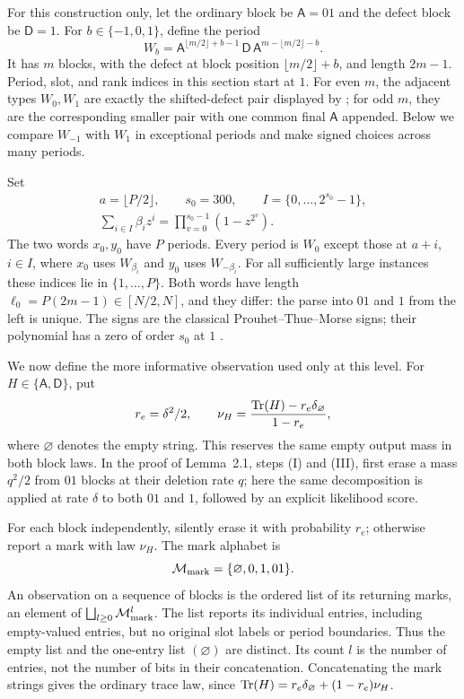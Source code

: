 For this construction only, let the ordinary block be
\(\mathsf A=01\) and the defect block be \(\mathsf D=1\). For
\(b\in\{-1,0,1\}\), define the period
\[
 W_b=\mathsf A^{\lfloor m/2\rfloor+b-1}\,
       \mathsf D\,
       \mathsf A^{m-\lfloor m/2\rfloor-b}.
\]
It has \(m\) blocks, with the defect at block position
\(\lfloor m/2\rfloor+b\), and length \(2m-1\). Period, slot, and rank indices in this section start at \(1\). For even \(m\), the adjacent types \(W_0,W_1\) are exactly the shifted-defect pair displayed by \citet[arXiv v2, Introduction and Theorem~1]{Chase2021Lower}; for odd \(m\), they are the corresponding smaller pair with one common final \(\mathsf A\) appended. Below we compare \(W_{-1}\) with \(W_1\) in exceptional periods and make signed choices across many periods.

Set
\[
\begin{gathered}
 a=\lfloor P/2\rfloor,\qquad s_0=300,\qquad I=\{0,\ldots,2^{s_0}-1\},\\
 \sum_{i\in I}\beta_i z^i=\prod_{v=0}^{s_0-1}(1-z^{2^v}).
\end{gathered}
\]
The two words \(x_0,y_0\) have \(P\) periods. Every period is \(W_0\) except those at \(a+i\), \(i\in I\), where \(x_0\) uses \(W_{\beta_i}\) and \(y_0\) uses \(W_{-\beta_i}\). For all sufficiently large instances these indices lie in \(\{1,\ldots,P\}\). Both words have length
\(\ell_0=P(2m-1)\in[N/2,N]\), and they differ: the parse into \(01\) and \(1\) from the left is unique. The signs are the classical Prouhet--Thue--Morse signs; their polynomial has a zero of order \(s_0\) at \(1\) \citep[Proposition~2 and Theorem~6]{AlloucheShallit1999}.

We now define the more informative observation used only at this level. For \(H\in\{\mathsf A,\mathsf D\}\), put
\[
 r_e=\delta^2/2,\qquad
 \nu_H=\frac{\mathrm{Tr}(H)-r_e\delta_\varnothing}{1-r_e},
\]
where \(\varnothing\) denotes the empty string. This reserves the same empty output mass in both block laws. In the proof of Lemma~2.1, steps (I) and (III), \citet{HoldenLyons2020} first erase a mass \(q^2/2\) from \(01\) blocks at their deletion rate \(q\); here the same decomposition is applied at rate \(\delta\) to both \(01\) and \(1\), followed by an explicit likelihood score.

For each block independently, silently erase it with probability \(r_e\); otherwise report a mark with law \(\nu_H\). The mark alphabet is
\[
 \mathcal M_{\rm mark}=\{\varnothing,0,1,01\}.
\]
An observation on a sequence of blocks is the ordered list of its returning marks, an element of \(\bigsqcup_{l\ge0}\mathcal M_{\rm mark}^l\). The list reports its individual entries, including empty-valued entries, but no original slot labels or period boundaries. Thus the empty list and the one-entry list \((\varnothing)\) are distinct. Its count \(l\) is the number of entries, not the number of bits in their concatenation. Concatenating the mark strings gives the ordinary trace law, since
\(\mathrm{Tr}(H)=r_e\delta_\varnothing+(1-r_e)\nu_H\).

